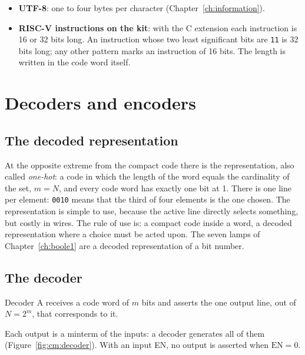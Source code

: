 \begin{itemize}
\item \textbf{UTF-8}: one to four bytes per character
  (Chapter~\ref{ch:information}).
\item \textbf{RISC-V instructions on the kit}: with the C extension each
  instruction is 16 or 32 bits long. An instruction whose two least
  significant bits are \texttt{11} is 32 bits long; any other pattern marks an
  instruction of 16 bits. The length is written in the code word itself.
\end{itemize}

\section{Decoders and encoders}

\subsection{The decoded representation}

At the opposite extreme from the compact code there is the 
representation, also called \emph{one-hot}: a code in which the length of the
word equals the cardinality of the set, $m=N$, and every code word has exactly
one bit at 1. There is one line per element: \texttt{0010} means that the
third of four elements is the one chosen. The representation is simple to
use, because the active line directly selects something, but costly in wires.
The rule of use is: a compact code inside a word, a decoded representation
where a choice must be acted upon. The seven lamps of
Chapter~\ref{ch:boole1} are a decoded representation of a bit number.

\subsection{The decoder}

\begin{definition}{Decoder}
A  receives a code word of $m$ bits and asserts the one output
line, out of $N=2^{m}$, that corresponds to it.
\end{definition}

Each output is a minterm of the inputs: a decoder generates all of them
(Figure~\ref{fig:cm:decoder}). With an  input EN, no output is
asserted when $\mathrm{EN}=0$.

